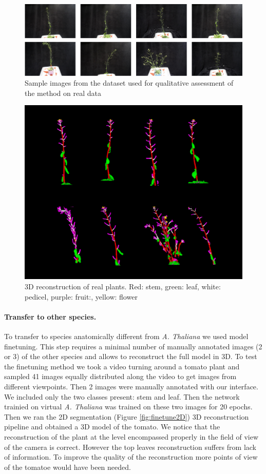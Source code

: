 \begin{figure}[h!]
    \centering \includegraphics[width = \linewidth]{figures/seg-crop.pdf}
    \caption{Sample images from the dataset used for qualitative assessment of the method on real data} \label{fig:realscans}
\end{figure}

\begin{figure}[h!]
    \centering \includegraphics[width = 0.7\linewidth]{figures/capture.png}
    \caption{3D reconstruction of real plants. Red: stem, green: leaf, white: pedicel, purple: fruit:, yellow: flower} \label{fig:rec3d}
\end{figure}

\paragraph{Transfer to other species.}
To transfer to species anatomically different from \emph{A. Thaliana} we used model finetuning. This step requires a minimal number of manually annotated images (2 or 3) of the other species and allows to reconstruct the full model in 3D. To test the finetuning method we took a video turning around a tomato plant and sampled 41 images equally distributed along the video to get images from different viewpoints. Then 2 images were manually annotated with our interface. We included only the two classes present: stem and leaf. Then the network trainied on virtual \emph{A. Thaliana} was trained on these two images for 20 epochs. Then we ran the 2D segmentation (Figure \ref{fig:finetune2D}) 3D reconstruction pipeline and obtained a 3D model of the tomato. We notice that the reconstruction of the plant at the level encompassed properly in the field of view of the camera is correct. However the top leaves reconstruction suffers from lack of information. To improve the quality of the reconstruction more points of view of the tomatoe would have been needed. 

